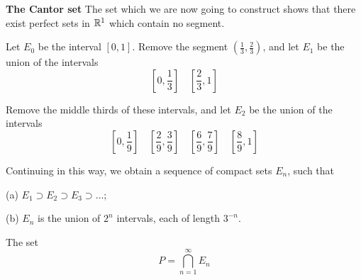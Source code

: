 \begin{myDef}
    \label{myDef:2.44}
	\textbf{The Cantor set} The set which we are now going to construct shows
	that there exist perfect sets in ${\protect\mathbb R}^{1}$ which contain no segment.
\end{myDef}


Let $E_0$ be the interval $[0, 1]$. Remove the segment $(\frac{1}{3}, \frac{2}{3})$, and let $E_1$ be the union of the intervals
\begin{equation*}
    \left[0, \frac{1}{3}\right] \quad 
    \left[\frac{2}{3}, 1\right]
\end{equation*}

Remove the middle thirds of these intervals, and let $E_2$ be the union of the intervals
\begin{equation*}
    \left[0, \frac{1}{9}\right] \quad 
    \left[\frac{2}{9}, \frac{3}{9}\right] \quad 
    \left[\frac{6}{9}, \frac{7}{9}\right] \quad 
    \left[\frac{8}{9}, 1\right]
\end{equation*}

Continuing in this way, we obtain a sequence of compact sets $E_n$, such that

(a) $E_1 \supset E_2 \supset E_3 \supset \dots$;

(b) $E_n$ is the union of $2^n$ intervals, each of length $3^{-n}$.

The set
\begin{equation*}
    P = \bigcap_{n=1}^{\infty} E_n
\end{equation*}

